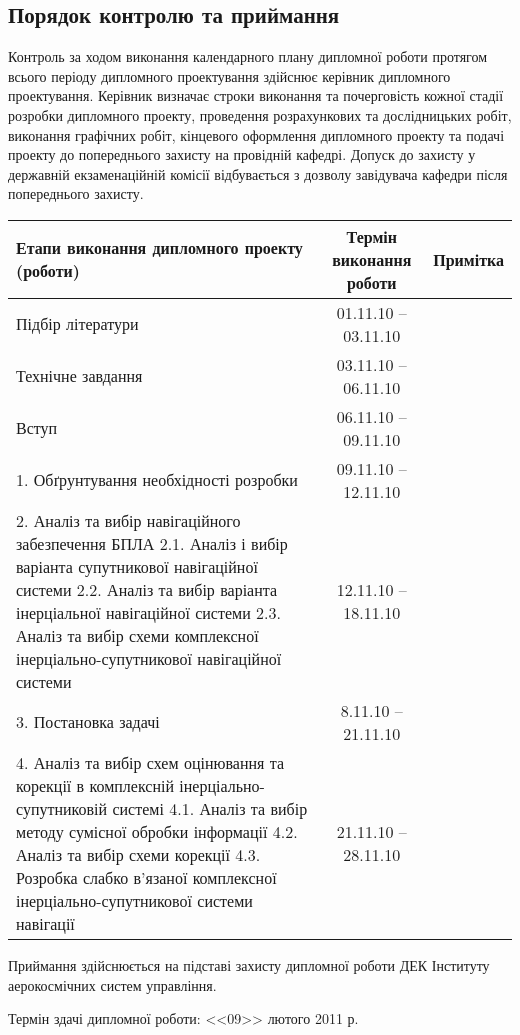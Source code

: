 \documentclass[ukrainian,utf8,simple,floatsingle,hpadding=5mm]{eskdtext}
\begin{document}
\subsection*{Порядок контролю та приймання}
Контроль за ходом виконання календарного плану дипломної роботи протягом 
всього періоду дипломного проектування здійснює керівник дипломного 
проектування. Керівник визначає строки виконання та почерговість кожної 
стадії розробки дипломного проекту, проведення розрахункових та 
дослідницьких робіт, виконання графічних робіт, кінцевого оформлення 
дипломного проекту та подачі проекту до попереднього захисту  на провідній 
кафедрі. Допуск до захисту у державній екзаменаційній комісії відбувається 
з дозволу завідувача кафедри після попереднього захисту.
\footnotesize
\begin{longtable}{|p{5cm}|c|c|}




\hline
\bfseries Етапи виконання дипломного проекту (роботи) & 
\bfseries Термін виконання роботи& \bfseries Примітка  \\


\hline
Підбір літератури
& 01.11.10 – 03.11.10 &  \\ 

\hline
Технічне завдання
& 03.11.10 – 06.11.10 &   \\ 
\hline
Вступ
& 06.11.10 – 09.11.10 &   \\ 
\hline
1. Обґрунтування необхідності розробки
& 09.11.10 – 12.11.10&   \\ 

\hline
2. Аналіз та вибір навігаційного забезпечення БПЛА
2.1. Аналіз і вибір варіанта супутникової навігаційної системи
2.2. Аналіз та вибір варіанта інерціальної навігаційної системи
2.3. Аналіз та вибір схеми комплексної інерціально-супутникової 
навігаційної системи 
& 12.11.10 – 18.11.10&   \\ 

\hline
3. Постановка задачі 
& 8.11.10 – 21.11.10&   \\ 
\hline
4.  Аналіз та вибір схем оцінювання та корекції в комплексній інерціально-супутниковій системі
4.1. Аналіз та вибір методу сумісної обробки інформації
4.2. Аналіз та вибір схеми корекції
4.3. Розробка слабко в’язаної комплексної інерціально-супутникової системи навігації 

&21.11.10 – 28.11.10&   \\ 
\hline




\end{longtable} 


Приймання здійснюється на підставі захисту дипломної роботи ДЕК Інституту 
аерокосмічних систем управління.

Термін здачі дипломної роботи: <<09>> лютого 2011 р.
\end{document}
